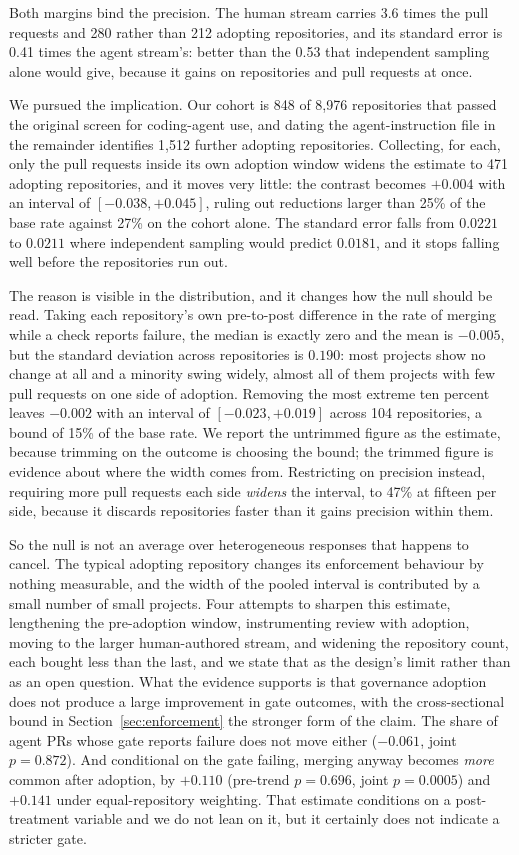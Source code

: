 \documentclass[mnsc]{informs4}
\begin{document}
Both margins bind the precision. The human stream carries 3.6 times the pull
requests and 280 rather than 212 adopting repositories, and its standard error is
0.41 times the agent stream's: better than the 0.53 that independent sampling
alone would give, because it gains on repositories and pull requests at once.

We pursued the implication. Our cohort is 848 of 8,976 repositories that passed
the original screen for coding-agent use, and dating the agent-instruction file in
the remainder identifies 1,512 further adopting repositories. Collecting, for each,
only the pull requests inside its own adoption window widens the estimate to 471
adopting repositories, and it moves very little: the contrast becomes $+0.004$ with
an interval of $[-0.038, +0.045]$, ruling out reductions larger than 25\% of the
base rate against 27\% on the cohort alone. The standard error falls from $0.0221$
to $0.0211$ where independent sampling would predict $0.0181$, and it stops falling
well before the repositories run out.

The reason is visible in the distribution, and it changes how the null should be
read. Taking each repository's own pre-to-post difference in the rate of merging while a check reports failure, the
median is exactly zero and the mean is $-0.005$, but the standard deviation across
repositories is $0.190$: most projects show no change at all and a minority swing
widely, almost all of them projects with few pull requests on one side of adoption. Removing the most extreme ten percent leaves $-0.002$ with an interval of
$[-0.023, +0.019]$ across 104 repositories, a bound of 15\% of the base rate. We
report the untrimmed figure as the estimate, because trimming on the outcome is
choosing the bound; the trimmed figure is evidence about where the width comes
from. Restricting on precision instead, requiring more pull requests each side
 \emph{widens} the interval, to 47\% at fifteen per side, because it discards
repositories faster than it gains precision within them.

So the null is not an average over heterogeneous responses that happens to cancel. The typical adopting repository changes its enforcement behaviour by nothing
measurable, and the width of the pooled interval is contributed by a small number
of small projects. Four attempts to sharpen this estimate, lengthening the
pre-adoption window, instrumenting review with adoption, moving to the larger
human-authored stream, and widening the repository count, each bought less than
the last, and we state that as the design's limit rather than as an open question. What the evidence supports is that governance adoption does not produce a large
improvement in gate outcomes, with the cross-sectional bound in
Section~\ref{sec:enforcement} the stronger form of the claim. The share of agent PRs whose
gate reports failure does not move either ($-0.061$, joint $p=0.872$). And
conditional on the gate failing, merging anyway becomes \emph{more} common after
adoption, by $+0.110$ (pre-trend $p=0.696$, joint $p=0.0005$) and $+0.141$ under
equal-repository weighting. That estimate conditions on a post-treatment variable
and we do not lean on it, but it certainly does not indicate a stricter gate.
\end{document}

